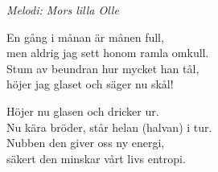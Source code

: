 {\footnotesize\textit{Melodi: Mors lilla Olle}}\par
\vspace{10pt}
En gång i månan är månen full,\\
men aldrig jag sett honom ramla omkull.\\
Stum av beundran hur mycket han tål,\\
höjer jag glaset och säger nu skål!\par
\vspace{10pt}
Höjer nu glasen och dricker ur.\\
Nu kära bröder, står helan (halvan) i tur.\\
Nubben den giver oss ny energi,\\
säkert den minskar vårt livs entropi.
